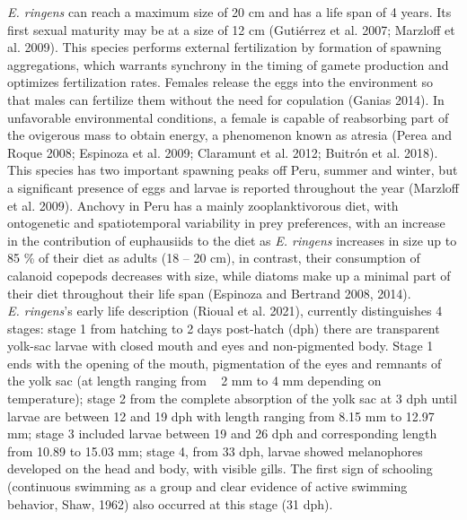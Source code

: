 \textit{E. ringens} can reach a maximum size of 20 cm and has a life span of 4 years. Its first sexual maturity may be at a size of 12 cm \citep{GutiSwar2007,MarzShin2009}(Gutiérrez et al. 2007; Marzloff et al. 2009). This species performs external fertilization by formation of spawning aggregations, which warrants synchrony in the timing of gamete production and optimizes fertilization rates. Females release the eggs into the environment so that males can fertilize them without the need for copulation \citep{Gani2014}(Ganias 2014). In unfavorable environmental conditions, a female is capable of reabsorbing part of the ovigerous mass to obtain energy, a phenomenon known as atresia \citep{PereRoqu2008,EspiVera2009,ClarCast2012,BuitPere2018}(Perea and Roque 2008; Espinoza et al. 2009; Claramunt et al. 2012; Buitrón et al. 2018). This species has two important spawning peaks off Peru, summer and winter, but a significant presence of eggs and larvae is reported throughout the year \citep{MarzShin2009}(Marzloff et al. 2009). Anchovy in Peru has a mainly zooplanktivorous diet, with ontogenetic and spatiotemporal variability in prey preferences, with an increase in the contribution of euphausiids to the diet as \textit{E. ringens} increases in size up to 85 \% of their diet as adults (18 – 20 cm), in contrast, their consumption of calanoid copepods decreases with size, while diatoms make up a minimal part of their diet throughout their life span \citep{EspiBert2008,EspiBert2014}(Espinoza and Bertrand 2008, 2014).\\

\textit{E. ringens}’s early life description \citep{RiouOfel2021}(Rioual et al. 2021), currently distinguishes 4 stages: stage 1 from hatching to 2 days post-hatch (dph) there are transparent yolk-sac larvae with closed mouth and eyes and non-pigmented body. Stage 1 ends with the opening of the mouth, pigmentation of the eyes and remnants of the yolk sac (at length ranging from ~ 2 mm to 4 mm depending on temperature); stage 2 from the complete absorption of the yolk sac at 3 dph until larvae are between 12 and 19 dph with length ranging from 8.15 mm to 12.97 mm; stage 3 included larvae between 19 and 26 dph and corresponding length from 10.89 to 15.03 mm; stage 4, from 33 dph, larvae showed melanophores developed on the head and body, with visible gills. The first sign of schooling (continuous swimming as a group and clear evidence of active swimming behavior, Shaw, 1962) also occurred at this stage (31 dph).\\

